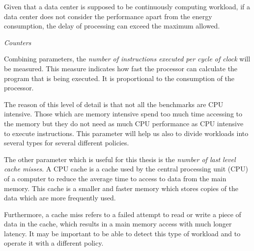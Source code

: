 Given that a data center is supposed to be continuously computing workload, if a data center does not consider the performance apart from the energy consumption, the delay of processing can exceed the maximum allowed.
 
\emph{Counters}

Combining parameters, the \emph{number of instructions executed per cycle of clock} will be measured. This measure indicates how fast the processor can calculate the program that is being executed. It is proportional to the consumption of the processor.


The reason of this level of detail is that not all the benchmarks are CPU intensive. Those which are memory intensive spend too much time accessing to the memory but they do not need as much CPU performance as CPU intensive to execute instructions. This parameter will help us also to divide workloads into several types for several different policies.

The other parameter which is useful for this thesis is the \emph{number of last level cache misses}. A CPU cache is a cache used by the central processing unit (CPU) of a computer to reduce the average time to access to data from the main memory. This cache is a smaller and faster memory which stores copies of the data which are more frequently used.

Furthermore, a cache miss refers to a failed attempt to read or write a piece of data in the cache, which results in a main memory access with much longer latency. It may be important to be able to detect this type of workload and to operate it with a different policy.
